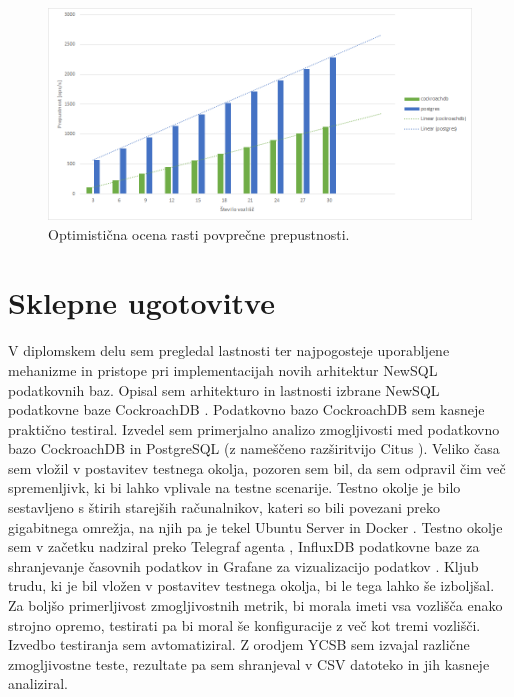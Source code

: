 \documentclass[a4paper, 12pt]{book}
\begin{document}
\begin{figure}[H]
\begin{center}
\includegraphics[width=1\textwidth]{resources/scaling-throughput-prediction-v2.png}
\end{center}
\caption{Optimistična ocena rasti povprečne prepustnosti.}
\label{img_ycsb_results_scaling_throughptu_prediction}
\end{figure}


\chapter{Sklepne ugotovitve}

V diplomskem delu sem pregledal lastnosti  ter najpogosteje uporabljene mehanizme in pristope pri implementacijah novih arhitektur NewSQL podatkovnih baz. Opisal sem arhitekturo in lastnosti izbrane NewSQL podatkovne baze CockroachDB \cite{CRDB-home}. Podatkovno bazo CockroachDB sem kasneje praktično testiral. Izvedel sem primerjalno analizo zmogljivosti med podatkovno bazo CockroachDB in PostgreSQL \cite{postgres} (z nameščeno razširitvijo Citus \cite{citus}). Veliko časa sem vložil v postavitev testnega okolja, pozoren sem bil, da sem odpravil čim več spremenljivk, ki bi lahko vplivale na testne scenarije. Testno okolje je bilo sestavljeno s štirih starejših računalnikov, kateri so bili povezani preko gigabitnega omrežja, na njih pa je tekel Ubuntu Server \cite{ubuntu-server} in Docker \cite{docker}. Testno okolje sem v začetku nadziral preko Telegraf agenta \cite{telegraf}, InfluxDB podatkovne baze za shranjevanje časovnih podatkov \cite{influxdb} in Grafane za vizualizacijo podatkov \cite{grafana}. Kljub trudu, ki je bil vložen v postavitev testnega okolja, bi le tega lahko še izboljšal. Za boljšo primerljivost zmogljivostnih metrik, bi morala imeti vsa vozlišča enako strojno opremo, testirati pa bi moral še konfiguracije z več kot tremi vozlišči. Izvedbo testiranja sem avtomatiziral. Z orodjem YCSB \cite{brianfrankcooper/YCSB} sem izvajal različne zmogljivostne teste, rezultate pa sem shranjeval v CSV datoteko in jih kasneje analiziral.
\end{document}

